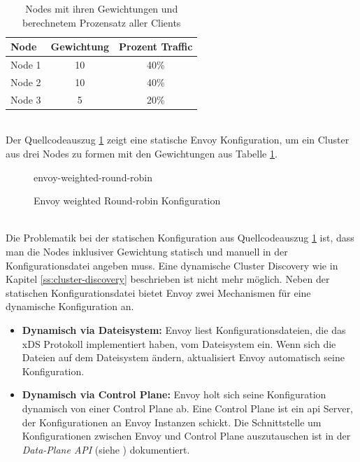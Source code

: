 \begin{table}[h!]
\centering
\renewcommand{\arraystretch}{1.5}
\begin{tabular}{|l|c|c|}
    \hline
    \textbf{Node} & \textbf{Gewichtung} & \textbf{Prozent Traffic} \\
    \hline
    \hline
    Node 1 & 10 & 40\% \\
    \hline
    Node 2 & 10 & 40\% \\
    \hline
    Node 3 & 5 & 20\% \\
    \hline
\end{tabular}
\caption{Nodes mit ihren Gewichtungen und berechnetem Prozensatz aller Clients}
\label{table:example-cluster-weight}
\end{table}
\\
Der Quellcodeauszug \ref{code:envoy-cluster-weight} zeigt eine statische Envoy Konfiguration, um ein Cluster aus drei Nodes zu formen mit den Gewichtungen aus Tabelle \ref{table:example-cluster-weight}.
\begin{figure}
    {envoy-weighted-round-robin}
    \caption{Envoy weighted Round-robin Konfiguration}
    \label{code:envoy-cluster-weight}
\end{figure}
\\
Die Problematik bei der statischen Konfiguration aus Quellcodeauszug \ref{code:envoy-cluster-weight} ist, dass man die Nodes inklusiver Gewichtung statisch und manuell in der Konfigurationsdatei angeben muss. Eine dynamische Cluster Discovery wie in Kapitel \ref{ss:cluster-discovery} beschrieben ist nicht mehr möglich.
Neben der statischen Konfigurationsdatei bietet Envoy zwei Mechanismen für eine dynamische Konfiguration an.
\begin{itemize}
  \item \textbf{Dynamisch via Dateisystem:} Envoy liest Konfigurationsdateien, die das xDS Protokoll implementiert haben, vom Dateisystem ein. Wenn sich die Dateien auf dem Dateisystem ändern, aktualisiert Envoy automatisch seine Konfiguration.
    \cite{ConfigurationDynamicFilesystem}
  \item \textbf{Dynamisch via Control Plane:} Envoy holt sich seine Konfiguration dynamisch von einer Control Plane ab. Eine Control Plane ist ein \ac{api} Server, der Konfigurationen an Envoy Instanzen schickt. Die Schnittstelle um Konfigurationen zwischen Envoy und Control Plane auszutauschen ist in der \textit{Data-Plane API} (siehe \cite{EnvoyproxyDataplaneapi2021}) dokumentiert.
    \cite{ConfigurationDynamicControl}
\end{itemize}
